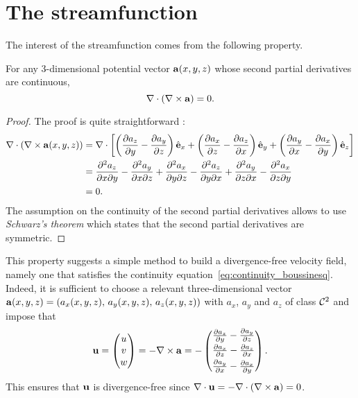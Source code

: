 \section{The streamfunction} \label{app:streamfunction}
The interest of the streamfunction comes from the following property.
\begin{property} \label{prop:streamfunction}
	For any 3-dimensional potential vector $\mathbf a(x,y,z)$ whose second partial derivatives are continuous,
	\begin{equation}
		\nabla \cdot (\nabla \times \mathbf a) = 0.
	\end{equation}
\end{property}
\begin{proof}
	The proof is quite straightforward :
	\begin{align*}
		\nabla \cdot (\nabla \times \mathbf a(x,y,z)) &= \nabla \cdot \left[\left(\frac{\partial a_z}{\partial y}-\frac{\partial a_y}{\partial z}\right)\hat{\mathbf{e}}_x + \left(\frac{\partial a_x}{\partial z}-\frac{\partial a_z}{\partial x}\right)\hat{\mathbf{e}}_y + \left(\frac{\partial a_y}{\partial x}-\frac{\partial a_x}{\partial y}\right)\hat{\mathbf{e}}_z \right]\\
		&= \frac{\partial^2 a_z}{\partial x \partial y} - \frac{\partial^2 a_y}{\partial x \partial z} + \frac{\partial^2 a_x}{\partial y \partial z} - \frac{\partial^2 a_z}{\partial y \partial x} + \frac{\partial^2 a_y}{\partial z \partial x} - \frac{\partial^2 a_x}{\partial z \partial y}\\
		&= 0.  
	\end{align*}
	The assumption on the continuity of the second partial derivatives allows to use \textit{Schwarz's theorem} which states that the second partial derivatives are symmetric.
\end{proof}
This property suggests a simple method to build a divergence-free velocity field, namely one that satisfies the continuity equation~\eqref{eq:continuity_boussinesq}. Indeed, it is sufficient to choose a relevant three-dimensional vector $\mathbf a(x,y,z) = (a_x(x,y,z),\,a_y(x,y,z),\,a_z(x,y,z))$ with $a_x$, $a_y$ and $a_z$ of class $\mathcal{C}^2$ and impose that 
\begin{equation} \label{eq:stream3d}
	\mathbf u = \begin{pmatrix} u \\ v \\ w \end{pmatrix} = - \nabla \times \mathbf a = - \begin{pmatrix} \frac{\partial a_z}{\partial y}-\frac{\partial a_y}{\partial z}\\[.1 cm]
													\frac{\partial a_x}{\partial z}-\frac{\partial a_z}{\partial x}\\[.1 cm]
													\frac{\partial a_y}{\partial x}-\frac{\partial a_x}{\partial y}
									\end{pmatrix}.
\end{equation}
This ensures that $\mathbf u$ is divergence-free since $\nabla \cdot \mathbf u = - \nabla \cdot \left( \nabla \times \mathbf a \right) = 0$.

